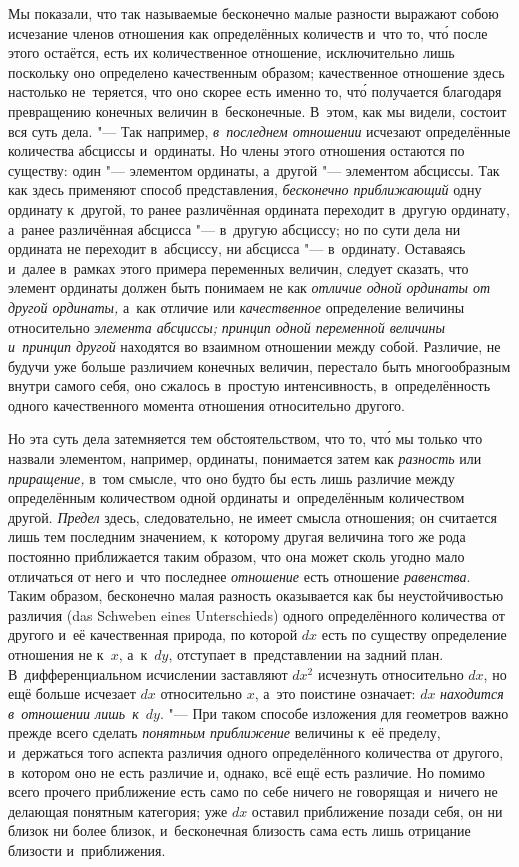 Мы показали, что так называемые бесконечно малые разности выражают собою
исчезание членов отношения как определённых количеств и~что то, чт\'{о} после этого
остаётся, есть их количественное отношение, исключительно лишь поскольку оно
определено качественным образом; качественное отношение здесь настолько
не~теряется, что оно скорее есть именно то, чт\'{о} получается благодаря
превращению конечных величин в~бесконечные. В~этом, как мы видели, состоит вся
суть дела. "--- Так например, {\em в~последнем отношении} исчезают определённые
количества абсциссы и~ординаты. Но члены этого отношения остаются по существу:
один "--- элементом ординаты, а~другой "--- элементом абсциссы. Так как здесь
применяют способ представления, {\em бесконечно приближающий} одну ординату
к~другой, то ранее различённая ордината переходит в~другую ординату, а~ранее
различённая абсцисса "--- в~другую абсциссу; но по сути дела ни ордината
не переходит в~абсциссу, ни абсцисса "--- в~ординату. Оставаясь
и~далее в~рамках этого примера переменных
величин, следует сказать, что элемент ординаты должен быть понимаем не как
{\em отличие одной ординаты от другой ординаты,} а~как отличие или
{\em качественное} определение величины относительно {\em элемента абсциссы;}
{\em принцип одной переменной величины и~принцип другой} находятся во взаимном
отношении между собой. Различие, не будучи уже больше различием конечных
величин, перестало быть многообразным внутри самого себя, оно сжалось в~простую
интенсивность, в~определённость одного качественного момента отношения
относительно другого.

Но эта суть дела затемняется тем обстоятельством, что то, чт\'{о} мы только что
назвали элементом, например, ординаты, понимается затем как {\em разность} или
{\em приращение,} в~том смысле, что оно будто бы есть лишь различие между
определённым количеством одной ординаты и~определённым количеством другой.
{\em Предел} здесь, следовательно, не имеет смысла отношения; он считается лишь
тем последним значением, к~которому другая величина того же рода постоянно
приближается таким образом, что она может сколь угодно мало отличаться от него
и~что последнее {\em отношение} есть отношение {\em равенства}. Таким образом,
бесконечно малая разность оказывается как бы неустойчивостью различия (das
Schweben eines Unter\-schieds) одного определённого количества от другого и~её
качественная природа, по которой $dx$ есть по существу определение отношения не
к~$x$, а~к~$dy$, отступает в~представлении на задний план. В~дифференциальном
исчислении заставляют $dx^2$ исчезнуть относительно $dx$, но ещё больше
исчезает $dx$ относительно $x$, а~это поистине означает: $dx$
{\em находится в~отношении лишь~к}~$dy$. "--- При таком способе изложения для
геометров важно прежде всего сделать {\em понятным приближение}
величины к~её пределу, и~держаться того аспекта различия одного
определённого количества от другого, в~котором оно не есть различие и, однако,
всё ещё есть различие. Но помимо всего прочего приближение есть само по себе
ничего не говорящая и~ничего не делающая понятным категория; уже $dx$ оставил
приближение позади себя, он ни близок ни более близок, и~бесконечная близость
сама есть лишь отрицание близости и~приближения.

